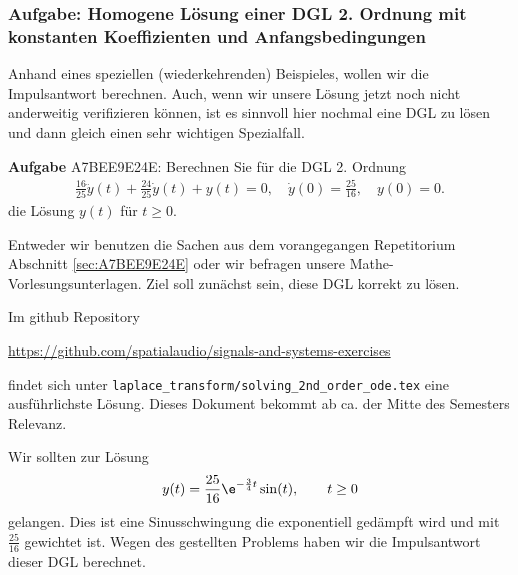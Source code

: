 \subsubsection{Aufgabe: Homogene Lösung einer DGL 2. Ordnung mit konstanten
Koeffizienten und Anfangsbedingungen}
\label{sec:A7BEE9E24E_Aufgabe}
\begin{Ziel}
Anhand eines speziellen (wiederkehrenden) Beispieles, wollen wir die Impulsantwort berechnen. Auch,
wenn wir unsere Lösung jetzt noch nicht anderweitig verifizieren können,
ist es sinnvoll hier nochmal eine DGL zu lösen und dann gleich einen sehr wichtigen
Spezialfall.
\end{Ziel}
\textbf{Aufgabe} {\tiny A7BEE9E24E}: Berechnen Sie für die DGL 2. Ordnung
\begin{align}
\frac{16}{25} \ddot{y}(t) + \frac{24}{25} \dot{y}(t) + y(t) = 0,
\quad \dot{y}(0)=\frac{25}{16}, \quad y(0)=0.
\end{align}
die Lösung $y(t)$ für $t\geq 0$.
\begin{Werkzeug}
Entweder wir benutzen die Sachen aus dem vorangegangen Repetitorium Abschnitt
\ref{sec:A7BEE9E24E} oder
wir befragen unsere Mathe-Vorlesungsunterlagen. Ziel soll zunächst sein, diese
DGL korrekt zu lösen.
\end{Werkzeug}
\begin{Ansatz}
Im github Repository

\url{https://github.com/spatialaudio/signals-and-systems-exercises}

findet sich unter \verb|laplace_transform/solving_2nd_order_ode.tex| eine
ausführlichste Lösung.
Dieses Dokument bekommt ab ca. der Mitte des Semesters Relevanz.
\end{Ansatz}
\begin{Loesung}
Wir sollten zur Lösung
\begin{align}
y(t) = \frac{25}{16} \e^{-\frac{3}{4} t} \sin(t), \qquad t\geq 0
\end{align}
gelangen.
%
Dies ist eine Sinusschwingung die exponentiell gedämpft wird und mit
$\frac{25}{16}$ gewichtet ist.
Wegen des gestellten Problems haben wir die Impulsantwort dieser DGL berechnet.
\end{Loesung}
